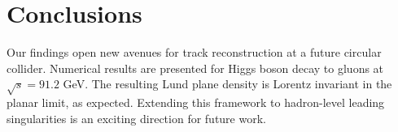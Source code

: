 \section{Conclusions}\label{sec:conclusions}

Our findings open new avenues for track reconstruction at a future
circular collider. Numerical results are presented for Higgs boson decay
to gluons at $\sqrt{s} = 91.2$ GeV. The resulting Lund plane density is
Lorentz invariant in the planar limit, as expected. Extending this
framework to hadron-level leading singularities is an exciting direction
for future work.

